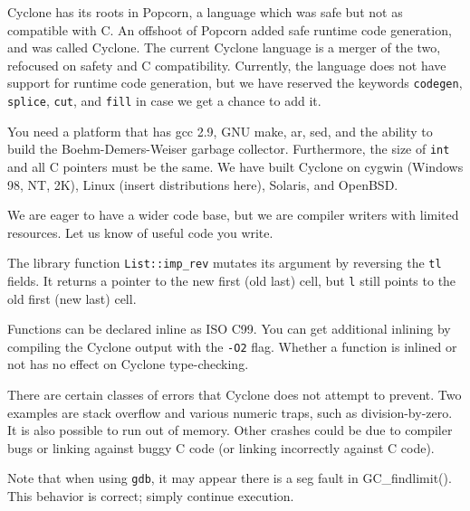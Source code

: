 
Cyclone has its roots in Popcorn, a language which was safe but not as
compatible with C\@.  An offshoot of Popcorn added safe runtime code
generation, and was called Cyclone.  The current Cyclone language is a
merger of the two, refocused on safety and C compatibility.
Currently, the language does not have support for runtime code
generation, but we have reserved the keywords \texttt{codegen},
\texttt{splice}, \texttt{cut}, and \texttt{fill} in case we get a
chance to add it.


You need a platform that has gcc 2.9, GNU make, ar, sed, and the
ability to build the Boehm-Demers-Weiser garbage collector.
Furthermore, the size of \texttt{int} and all C pointers must be the
same.  We have built Cyclone on cygwin (Windows 98, NT, 2K), Linux
(insert distributions here), Solaris, and OpenBSD.


We are eager to have a wider code base, but we are compiler writers
with limited resources.  Let us know of useful code you write.


The library function \texttt{List::imp_rev} mutates its argument by
reversing the \texttt{tl} fields.  It returns a pointer to the new
first (old last) cell, but \texttt{l} still points to the old first
(new last) cell.


Functions can be declared inline as ISO C99.  You can get additional
inlining by compiling the Cyclone output with the \texttt{-O2} flag.
Whether a function is inlined or not has no effect on Cyclone
type-checking.


There are certain classes of errors that Cyclone does not attempt to
prevent.  Two examples are stack overflow and various numeric traps,
such as division-by-zero.  It is also possible to run out of memory.
Other crashes could be due to compiler bugs or linking against buggy C
code (or linking incorrectly against C code).

Note that when using \texttt{gdb}, it may appear there is a seg fault
in GC_findlimit().  This behavior is correct; simply continue
execution.

